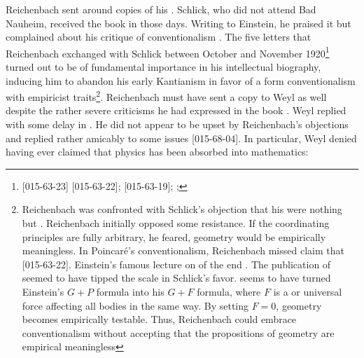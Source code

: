 \documentclass[draft]{article}
\begin{document}
Reichenbach sent around copies of his  \citep{Reichenbach1920a}. Schlick, who did not attend Bad Nauheim, received the book in those days. Writing to Einstein, he praised it but complained about his critique of conventionalism . The five letters that Reichenbach exchanged with Schlick between October and November 1920\footnote{[015-63-23]
[015-63-22];
[015-63-19]; ; } turned out to be of fundamental importance in his intellectual biography, inducing him to abandon his early Kantianism in favor of a form conventionalism with empiricist traits\footnote{Reichenbach was confronted with Schlick's objection that his  were nothing but . Reichenbach initially opposed some resistance. If the coordinating principles are fully arbitrary, he feared, geometry would be empirically meaningless. In Poincaré's conventionalism, Reichenbach missed  claim that  [015-63-22]. Einstein's famous lecture on  of the end . The publication of \citet{Einstein1921} seemed to have tipped the scale in Schlick's favor. \citet{Reichenbach1922a} seems to have turned Einstein's $G+P$ formula into his $G + F$ formula, where $F$ is a  or universal force affecting all bodies in the same way. By setting $F=0$, geometry becomes empirically testable. Thus, Reichenbach could embrace conventionalism without accepting that the propositions of geometry are empirical meaningless}. Reichenbach must have sent a copy to Weyl as well despite the rather severe criticisms he had expressed in the book \citep{Rynasiewicz2005}. Weyl replied with some delay in . He did not appear to be upset by Reichenbach's objections and replied rather amicably to some issues  [015-68-04]. In particular, Weyl denied having ever claimed that physics has been absorbed into mathematics:
\end{document}
